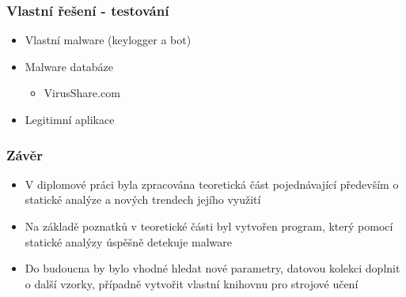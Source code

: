 \documentclass{beamer}
\begin{document}
\begin{frame}
\frametitle{Vlastní řešení - testování} 

\begin{itemize}
    \item Vlastní malware (keylogger a bot)
    \item Malware databáze
        \begin{itemize}
            \item VirusShare.com
        \end{itemize}
    \item Legitimní aplikace
\end{itemize}

\begin{table}[]
    \centering
    
\end{table}

\end{frame}

\begin{frame}
\frametitle{Závěr}


\begin{itemize}

    \item V diplomové práci byla zpracována teoretická část pojednávající především o statické analýze a nových trendech jejího využití
    \item Na základě poznatků v teoretické části byl vytvořen program, který pomocí statické analýzy úspěšně detekuje malware
    \item Do budoucna by bylo vhodné hledat nové parametry, datovou kolekci doplnit o další vzorky, případně vytvořit vlastní knihovnu pro strojové učení

\end{itemize}

\end{frame}
\end{document}
